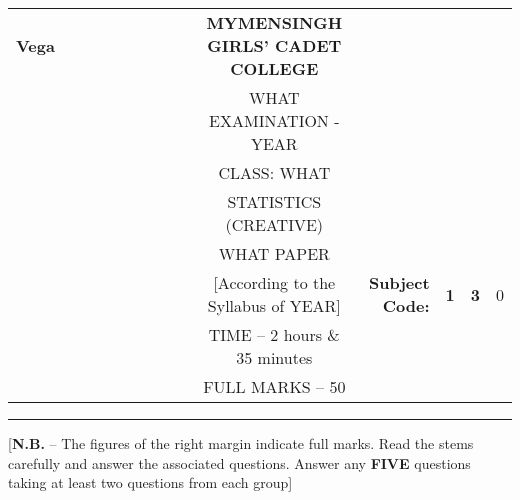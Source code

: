 \documentclass[12pt]{article}
\begin{document}
\begin{table}[]
\begin{tabular}{lllllllllcllcl}
\textbf{Vega} &  &  &  &  &  &  &  &  & \textbf{MYMENSINGH GIRLS’  CADET COLLEGE} &                                             &                                 & \multicolumn{1}{l}{}            &                        \\
              &  &  &  &  &  &  &  &  & WHAT EXAMINATION - YEAR                   &                                             &                                 &                                 &                        \\
              &  &  &  &  &  &  &  &  & CLASS: WHAT                               &                                             &                                 &                                 &                        \\
              &  &  &  &  &  &  &  &  & STATISTICS (CREATIVE)                     &                                             &                                 &                                 &                        \\
              &  &  &  &  &  &  &  &  & WHAT PAPER                                &                                             &                                 & \multicolumn{1}{r}{}            &                        \\ \cline{12-14} 
              &  &  &  &  &  &  &  &  & [According to the Syllabus of YEAR]       & \multicolumn{1}{r|}{\textbf{Subject Code:}} & \multicolumn{1}{l|}{\textbf{1}} & \multicolumn{1}{l|}{\textbf{3}} & \multicolumn{1}{l|}{0} \\ \cline{12-14} 
              &  &  &  &  &  &  &  &  & TIME – 2 hours \& 35 minutes              &                                             &                                 & \multicolumn{1}{r}{}            &                        \\
              &  &  &  &  &  &  &  &  & FULL MARKS – 50                           &                                             &                                 & \multicolumn{1}{r}{\textbf{}}   &                       
\end{tabular}
\end{table}


\hrule

\begin{center}
[\textbf{N.B.} – The figures of the right margin indicate full marks. Read the stems carefully and answer the associated questions. Answer any \textbf{FIVE} questions taking at least two questions from each group]\\
\end{center}
\end{document}
